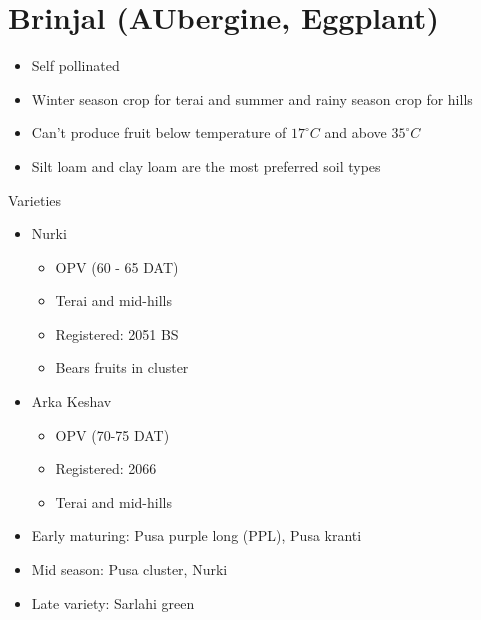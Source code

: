 \documentclass[
  ignorenonframetext,
  aspectratio=169]{beamer}
\providecommand{\tightlist}{%
  \setlength{\itemsep}{0pt}\setlength{\parskip}{0pt}}
\begin{document}
\hypertarget{brinjal-aubergine-eggplant}{%
\section{Brinjal (AUbergine,
Eggplant)}\label{brinjal-aubergine-eggplant}}

\begin{frame}{}
\protect\hypertarget{section-6}{}
\begin{itemize}
\tightlist
\item
  Self pollinated
\item
  Winter season crop for terai and summer and rainy season crop for
  hills
\item
  Can't produce fruit below temperature of \(17^\circ C\) and above
  \(35^\circ C\)
\item
  Silt loam and clay loam are the most preferred soil types
\end{itemize}
\end{frame}

\begin{frame}{Varieties}
\protect\hypertarget{varieties-1}{}
\begin{itemize}
\tightlist
\item
  Nurki

  \begin{itemize}
  \tightlist
  \item
    OPV (60 - 65 DAT)
  \item
    Terai and mid-hills
  \item
    Registered: 2051 BS
  \item
    Bears fruits in cluster
  \end{itemize}
\item
  Arka Keshav

  \begin{itemize}
  \tightlist
  \item
    OPV (70-75 DAT)
  \item
    Registered: 2066
  \item
    Terai and mid-hills
  \end{itemize}
\end{itemize}
\end{frame}

\begin{frame}{}
\protect\hypertarget{section-7}{}
\begin{itemize}
\tightlist
\item
  Early maturing: Pusa purple long (PPL), Pusa kranti
\item
  Mid season: Pusa cluster, Nurki
\item
  Late variety: Sarlahi green
\end{itemize}
\end{frame}
\end{document}
